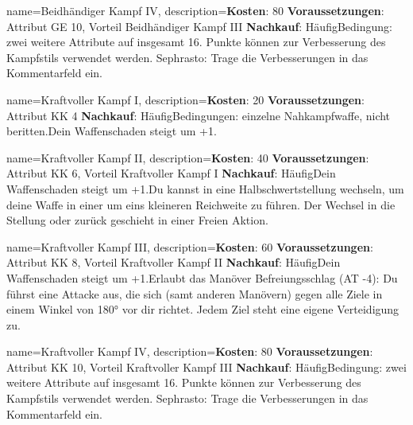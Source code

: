 {
    name={Beidhändiger Kampf IV},
    description={\textbf{Kosten}: 80 \textbf{Voraussetzungen}: Attribut GE 10, Vorteil Beidhändiger Kampf III \textbf{Nachkauf}: Häufig\newline Bedingung: zwei weitere Attribute auf insgesamt 16. Punkte können zur Verbesserung des Kampfstils verwendet werden. Sephrasto: Trage die Verbesserungen in das Kommentarfeld ein.}
}


{
    name={Kraftvoller Kampf I},
    description={\textbf{Kosten}: 20 \textbf{Voraussetzungen}: Attribut KK 4 \textbf{Nachkauf}: Häufig\newline Bedingungen: einzelne Nahkampfwaffe, nicht beritten.\newline Dein Waffenschaden steigt um +1.}
}


{
    name={Kraftvoller Kampf II},
    description={\textbf{Kosten}: 40 \textbf{Voraussetzungen}: Attribut KK 6, Vorteil Kraftvoller Kampf I \textbf{Nachkauf}: Häufig\newline Dein Waffenschaden steigt um +1.\newline Du kannst in eine Halbschwertstellung wechseln, um deine Waffe in einer um eins kleineren Reichweite zu führen. Der Wechsel in die Stellung oder zurück geschieht in einer Freien Aktion.}
}


{
    name={Kraftvoller Kampf III},
    description={\textbf{Kosten}: 60 \textbf{Voraussetzungen}: Attribut KK 8, Vorteil Kraftvoller Kampf II \textbf{Nachkauf}: Häufig\newline Dein Waffenschaden steigt um +1.\newline Erlaubt das Manöver Befreiungsschlag (AT -4): Du führst eine Attacke aus, die sich (samt anderen Manövern) gegen alle Ziele in einem Winkel von 180° vor dir richtet. Jedem Ziel steht eine eigene Verteidigung zu.}
}


{
    name={Kraftvoller Kampf IV},
    description={\textbf{Kosten}: 80 \textbf{Voraussetzungen}: Attribut KK 10, Vorteil Kraftvoller Kampf III \textbf{Nachkauf}: Häufig\newline Bedingung: zwei weitere Attribute auf insgesamt 16. Punkte können zur Verbesserung des Kampfstils verwendet werden. Sephrasto: Trage die Verbesserungen in das Kommentarfeld ein.}
}


